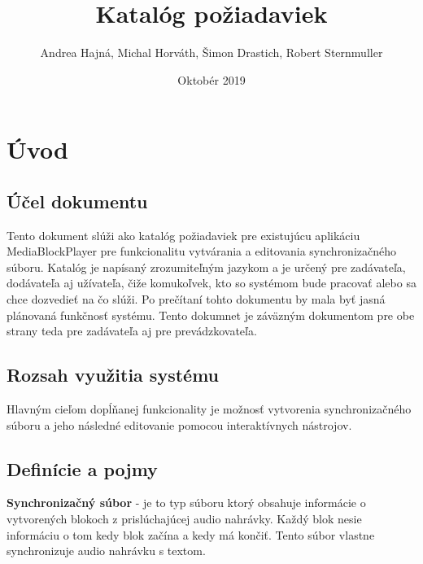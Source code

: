 \documentclass{article}
\title{Katalóg požiadaviek}
\author{Andrea Hajná, Michal Horváth, Šimon Drastich, Robert Sternmuller}
\date{Oktobér 2019}
\begin{document}

\maketitle %

\newpage


\tableofcontents

\newpage


\section{Úvod}

\subsection{Účel dokumentu }
 Tento dokument slúži ako katalóg požiadaviek pre existujúcu aplikáciu MediaBlockPlayer pre funkcionalitu vytvárania a editovania synchronizačného súboru. Katalóg je napísaný zrozumiteľným jazykom a je určený pre zadávateľa, dodávateľa aj užívateľa, čiže komukoľvek, kto so systémom bude pracovať alebo sa chce dozvedieť na čo slúži. Po prečítaní tohto dokumentu by mala byť jasná plánovaná funkčnosť systému.
Tento dokumnet je záväzným dokumentom pre obe strany teda pre zadávateľa aj pre prevádzkovateľa.

\subsection{Rozsah využitia systému}
Hlavným cieľom dopĺňanej funkcionality je možnosť vytvorenia synchronizačného súboru a jeho následné editovanie pomocou interaktívnych nástrojov.

\subsection{Definície a pojmy}
\textbf{Synchronizačný súbor} - je to typ súboru ktorý obsahuje informácie o vytvorených blokoch z prislúchajúcej audio nahrávky. Každý blok nesie informáciu o tom kedy blok začína a kedy má končiť. Tento súbor vlastne synchronizuje audio nahrávku s textom.
\end{document}
